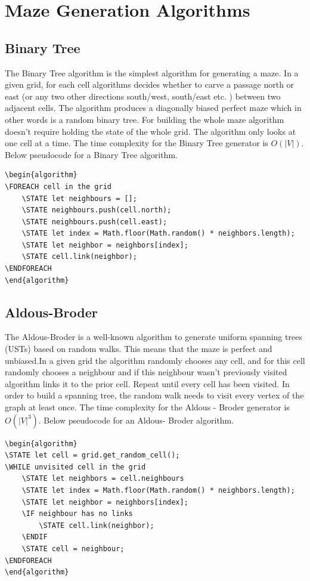  \section{Maze Generation Algorithms}
\subsection{Binary Tree}
The Binary Tree algorithm is the simplest algorithm for generating a maze. In a given grid, for each cell algorithms decides whether to carve a passage north or east (or any two other directions south/west, south/east etc. ) between two adjacent cells. The algorithm produces a diagonally biased perfect maze which in other words is a random binary tree. For building the whole maze algorithm doesn't require holding the state of the whole grid. The algorithm only looks at one cell at a time. The time complexity for the Binary Tree generator is $O(|V|)$. Below pseudocode for a Binary Tree algorithm.
\begin{lstlisting}[caption={Pseudocode for a Binary Tree Algorithm}]
\begin{algorithm}
\FOREACH cell in the grid
	\STATE let neighbours = [];
	\STATE neighbours.push(cell.north);
	\STATE neighbours.push(cell.east);
	\STATE let index = Math.floor(Math.random() * neighbors.length);
	\STATE let neighbor = neighbors[index];
	\STATE cell.link(neighbor);
\ENDFOREACH	
\end{algorithm}
\end{lstlisting}
\subsection{Aldous-Broder}
The Aldous-Broder is a well-known algorithm to generate uniform spanning trees (USTs) based on random walks. This means that the maze is perfect and unbiased.\cite{4}In a given grid the algorithm randomly chooses any cell, and for this cell randomly chooses a neighbour and if this neighbour wasn't previously visited algorithm links it to the prior cell. Repeat until every cell has been visited. In order to build a spanning tree, the random walk needs to visit every vertex of the graph at least once. The time complexity for the Aldous - Broder generator is $O(|V|^3)$. Below pseudocode for an Aldous- Broder algorithm.
\begin{lstlisting}[caption={Pseudocode for a Aldous-Broder algorithm}]
\begin{algorithm}
\STATE let cell = grid.get_random_cell();
\WHILE unvisited cell in the grid
	\STATE let neighbors = cell.neighbours
	\STATE let index = Math.floor(Math.random() * neighbors.length);
	\STATE let neighbor = neighbors[index];
	\IF neighbour has no links
		\STATE cell.link(neighbor);
	\ENDIF
	\STATE cell = neighbour;
\ENDFOREACH
\end{algorithm}
\end{lstlisting}
